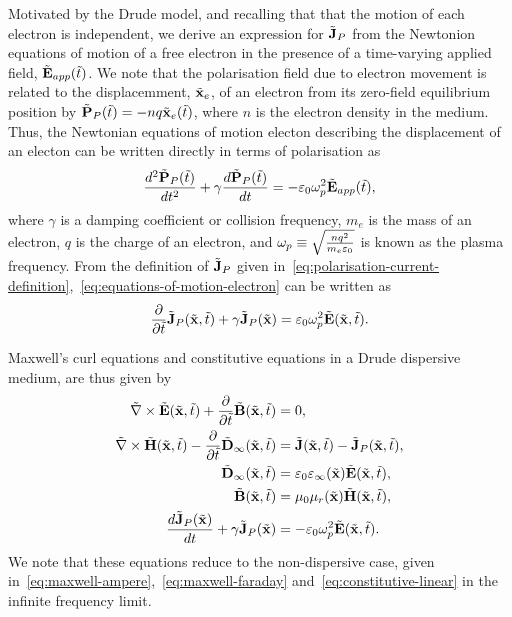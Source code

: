 Motivated by the Drude model, and recalling that that the motion of each
electron is independent, we derive an expression for $\tilde{\mathbf{J}}_P$ from the
Newtonion equations of motion of a free electron in the presence of a
time-varying applied field, $\tilde{\mathbf{E}}_{app}(\tilde{t})$. We note that the
polarisation field due to electron movement is related to the displacemment,
$\tilde{\mathbf{x}}_e$, of an electron from its zero-field equilibrium position by $
\tilde{\mathbf{P}}_P(\tilde{t}) = - n q \tilde{\mathbf{x}}_e(\tilde{t}) $, where $n$ is the
electron density in the medium. Thus, the Newtonian equations of motion electon
describing the displacement of an electon can be written directly in terms of
polarisation as
\begin{equation}
  \label{eq:equations-of-motion-electron}
  \frac{d^2 \tilde{\mathbf{P}}_P(\tilde{t}) }{dt^2} + \gamma \frac{d \tilde{\mathbf{P}}_P(\tilde{t}) }{dt} = - \varepsilon_0 \omega_p^2 \tilde{\mathbf{E}}_{app}(\tilde{t}),
\end{equation}
where $\gamma$ is a damping coefficient or collision frequency, $m_e$ is the
mass of an electron, $q$ is the charge of an electron, and $\omega_p \equiv
\sqrt{\frac{n q^2}{m_e \varepsilon_0}}$ is known as the plasma frequency.
From the definition of $\tilde{\mathbf{J}}_P$ given
in~\eqref{eq:polarisation-current-definition},~\eqref{eq:equations-of-motion-electron} 
can be written as
\begin{equation}
  \frac{\partial}{\partial \tilde{t} } \tilde{\mathbf{J}}_P(\tilde{\mathbf{x}},\tilde{t}) + \gamma \tilde{\mathbf{J}}_P(\tilde{\mathbf{x}}) = \varepsilon_0 \omega_p^2 \tilde{\mathbf{E}}(\tilde{\mathbf{x}},\tilde{t}).
  \label{eq:pol-current-ADE}
\end{equation}

Maxwell's curl equations and constitutive equations in a Drude dispersive
medium, are thus given by
\begin{subequations}
  \label{eq:dispersive-maxwell-system}
  \begin{align}
    \tilde{\nabla} \times \tilde{\mathbf{E}}(\tilde{\mathbf{x}},\tilde{t}) + \frac{\partial}{\partial \tilde{t} }  \tilde{\mathbf{B}}(\tilde{\mathbf{x}}, \tilde{t})&= 0, \\
    \tilde{\nabla} \times \tilde{\mathbf{H}}(\tilde{\mathbf{x}},\tilde{t}) - \frac{\partial}{\partial \tilde{t} }  \tilde{\mathbf{D}}_{\infty}(\tilde{\mathbf{x}}, \tilde{t})&= \tilde{\mathbf{J}}(\tilde{\mathbf{x}},\tilde{t}) - \tilde{\mathbf{J}}_P(\tilde{\mathbf{x}},\tilde{t}), \\
    \tilde{\mathbf{D}}_{\infty}(\tilde{\mathbf{x}},\tilde{t}) &= \varepsilon_0 \varepsilon_{\infty}(\tilde{\mathbf{x}}) \tilde{\mathbf{E}}(\tilde{\mathbf{x}},\tilde{t}), \\
    \tilde{\mathbf{B}}(\tilde{\mathbf{x}},\tilde{t}) &= \mu_0 \mu_r(\tilde{\mathbf{x}}) \tilde{\mathbf{H}}(\tilde{\mathbf{x}},\tilde{t}), \\
    \frac{d \tilde{\mathbf{J}}_P(\tilde{\mathbf{x}})}{dt} + \gamma \tilde{\mathbf{J}}_P(\tilde{\mathbf{x}}) &= - \varepsilon_0 \omega_p^2 \tilde{\mathbf{E}}(\tilde{\mathbf{x}}, \tilde{t}) . \label{eq:maxwell-dispersive-ADE}
  \end{align}
\end{subequations}
We note that these equations reduce to the non-dispersive case, given
in~\eqref{eq:maxwell-ampere},~\eqref{eq:maxwell-faraday}
and~\eqref{eq:constitutive-linear} in the infinite frequency limit.


